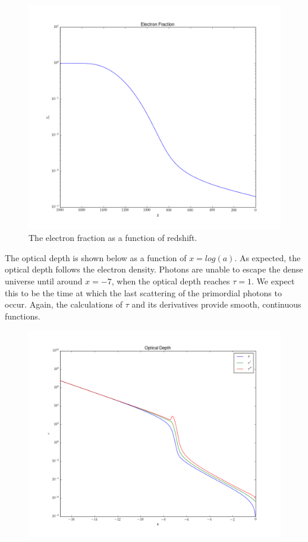 \documentclass[twoside]{article}
\begin{document}
\begin{figure}[ht!]\label{fig:elecfrac}
\includegraphics[scale=0.45]{electronfraction}
\caption{The electron fraction as a function of redshift.}
\end{figure}

\clearpage

The optical depth is shown below as a function of $x=log(a)$. As expected, the optical depth follows the electron density. Photons are unable to escape the dense universe until around $x = -7$, when the optical depth reaches $\tau = 1$. We expect this to be the time at which the last scattering of the primordial photons to occur. Again, the calculations of $\tau$ and its derivatives provide smooth, continuous functions.

\begin{figure}[ht!]\label{fig:optdepth}
\includegraphics[scale=0.5]{opticaldepths_nolog}
\end{figure}
\end{document}
